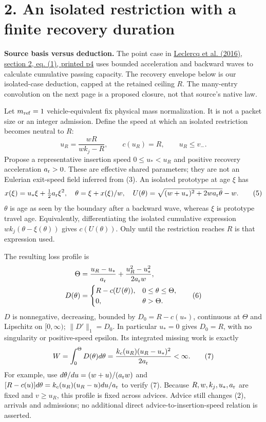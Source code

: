 \documentclass[11pt,a4paper]{article}
\begin{document}
\newpage
\section*{2. An isolated restriction with a finite recovery duration}

\textbf{Source basis versus deduction.} The point case in
\href{https://repository.tudelft.nl/file/File_c424c1b3-7374-436b-a6a7-abdf69063aa6}{Leclercq et al. (2016), section 2, eq. (1), printed p4}
uses bounded acceleration and backward waves to calculate cumulative
passing capacity. The recovery envelope below is our isolated-case
deduction, capped at the retained ceiling $R$. The many-entry convolution
on the next page is a proposed closure, not that source's native law.

Let $m_{\rm ref}=1$ vehicle-equivalent fix physical mass normalization.
It is not a packet size or an integer admission. Define the speed at which
an isolated restriction becomes neutral to $R$:
\begin{equation}
 u_R=\frac{wR}{wk_j-R},\qquad c(u_R)=R,\qquad u_R\leq v_-.
 \tag{4}
\end{equation}
Propose a representative insertion speed $0\leq u_*<u_R$ and positive
recovery acceleration $a_{\rm r}>0$. These are effective shared parameters;
they are not an Eulerian exit-speed field inferred from (3). An isolated
prototype at age $\xi$ has
\begin{equation}
 x(\xi)=u_*\xi+\tfrac12a_{\rm r}\xi^2,\quad
 \theta=\xi+x(\xi)/w,\quad
 U(\theta)=\sqrt{(w+u_*)^2+2wa_{\rm r}\theta}-w.
 \tag{5}
\end{equation}
$\theta$ is age as seen by the boundary after a backward wave, whereas
$\xi$ is prototype travel age. Equivalently, differentiating the isolated
cumulative expression $wk_j(\theta-\xi(\theta))$ gives $c(U(\theta))$.
Only until the restriction reaches $R$ is that expression used.

The resulting loss profile is
\begin{align}
 \Theta&=\frac{u_R-u_*}{a_{\rm r}}
       +\frac{u_R^2-u_*^2}{2a_{\rm r}w},\nonumber\\
 D(\theta)&=
 \begin{cases} R-c(U(\theta)),&0\leq\theta\leq\Theta,\\
                0,&\theta>\Theta.
 \end{cases}
 \tag{6}
\end{align}
$D$ is nonnegative, decreasing, bounded by $D_0=R-c(u_*)$, continuous
at $\Theta$ and Lipschitz on $[0,\infty)$; $\|D'\|_1=D_0$.
In particular $u_*=0$ gives $D_0=R$, with no singularity or positive-speed
epsilon. Its integrated missing work is exactly
\begin{equation}
 W=\int_0^\Theta D(\theta)d\theta
   =\frac{k_c(u_R)(u_R-u_*)^2}{2a_{\rm r}}<\infty.
 \tag{7}
\end{equation}
For example, use $d\theta/du=(w+u)/(a_{\rm r}w)$ and
$[R-c(u)]d\theta=k_c(u_R)(u_R-u)du/a_{\rm r}$ to verify (7).
Because $R,w,k_j,u_*,a_{\rm r}$ are fixed and $v\geq u_R$, this profile
is fixed across advices. Advice still changes (2), arrivals and admissions;
no additional direct advice-to-insertion-speed relation is asserted.
\end{document}
